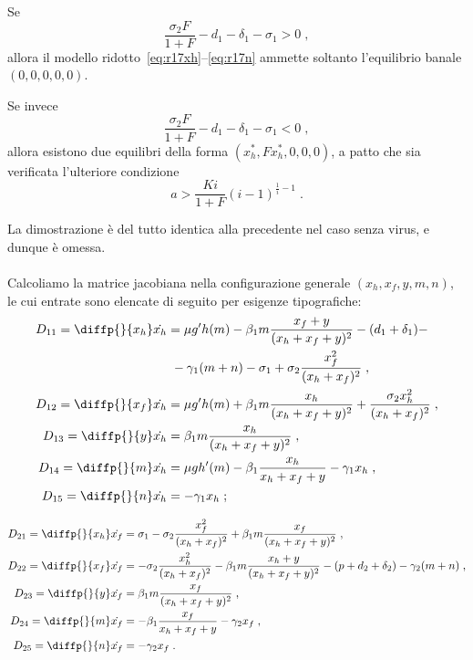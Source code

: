 \begin{proposizione}
Se
$$\frac{\sigma_2 F}{1+F} - d_1 -\delta_1 -\sigma_1 > 0 \; ,$$
allora il modello ridotto~\eqref{eq:r17xh}--\eqref{eq:r17n} ammette
soltanto l'equilibrio banale $(0,0,0,0,0)$.

Se invece
$$\frac{\sigma_2 F}{1+F} - d_1 -\delta_1 -\sigma_1 < 0 \; ,$$
allora esistono due equilibri della forma $(x_h^*, F x_h^*, 0, 0, 0)$,
a patto che sia verificata l'ulteriore condizione
$$a > \frac{Ki}{1+F} {(i-1)}^{\frac{1}{i} -1} \; .$$
\label{prop:exist5D}
\end{proposizione}

La dimostrazione è del tutto identica alla precedente nel caso senza virus, e dunque è omessa.

\paragraph{}
Calcoliamo la matrice jacobiana nella configurazione generale $(x_h, x_f, y, m, n)$,
le cui entrate sono elencate di seguito per esigenze tipografiche:
\begin{equation}
\begin{split} %
D_{11} = \diffp{}{{x_h}} \dot{x_h} &=
    \mu g' h(m) - \beta_1 m \frac{x_f + y}{(x_h+x_f+y)^2} - (d_1 +\delta_1) - \\
    &~ - \gamma_1 (m+n) - \sigma_1 + \sigma_2 \frac{x_f^2}{(x_h+x_f)^2} \; , \\
D_{12} = \diffp{}{{x_f}} \dot{x_h} &= \mu g' h(m) + \beta_1 m \frac{x_h}{(x_h+x_f+y)^2} +
    \frac{\sigma_2 x_h^2}{(x_h+x_f)^2} \; , \\
D_{13} = \diffp{}{{y}} \dot{x_h} &= \beta_1 m \frac{x_h}{(x_h+x_f+y)^2} \; , \\
D_{14} = \diffp{}{m} \dot{x_h} &= \mu g h'(m) - \beta_1 \frac{x_h}{x_h+x_f+y} - \gamma_1 x_h \; , \\
D_{15} = \diffp{}{n} \dot{x_h} &= -\gamma_1 x_h \; ;
\end{split}
\end{equation}

\begin{equation} %
\begin{split}
D_{21} = \diffp{}{{x_h}} \dot{x_f} &= \sigma_1 - \sigma_2 \frac{x_f^2}{(x_h+x_f)^2} +
    \beta_1 m \frac{x_f}{(x_h+x_f+y)^2} \; , \\
D_{22} = \diffp{}{{x_f}} \dot{x_f} &= -\sigma_2 \frac{x_h^2}{(x_h+x_f)^2} - \beta_1 m \frac{x_h+y}{(x_h+x_f+y)^2}
    - (p + d_2 + \delta_2) - \gamma_2 (m+n) \; , \\
D_{23} = \diffp{}{y} \dot{x_f} &= \beta_1 m \frac{x_f}{(x_h+x_f+y)^2} \; , \\
D_{24} = \diffp{}{m} \dot{x_f} &= -\beta_1 \frac{x_f}{x_h+x_f+y} - \gamma_2 x_f \; , \\
D_{25} = \diffp{}{n} \dot{x_f} &= -\gamma_2 x_f \; .
\end{split}
\end{equation}

